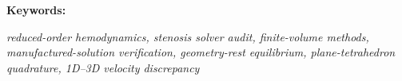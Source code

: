 \medskip
\noindent\textbf{Keywords:}\par\smallskip
{\raggedright\itshape reduced-order hemodynamics, stenosis solver audit, finite-volume methods, manufactured-solution verification, geometry-rest equilibrium, plane-tetrahedron quadrature, 1D--3D velocity discrepancy\par}
